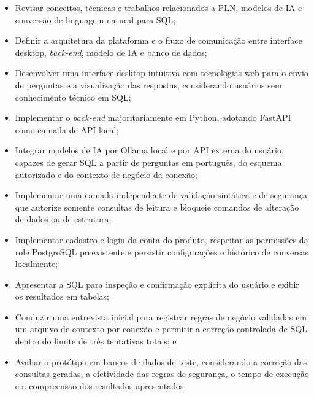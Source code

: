 \begin{itemize}
    \item Revisar conceitos, técnicas e trabalhos relacionados a PLN, modelos de IA e conversão de linguagem natural para SQL;
    \item Definir a arquitetura da plataforma e o fluxo de comunicação entre interface desktop, \textit{back-end}, modelo de IA e banco de dados;
    \item Desenvolver uma interface desktop intuitiva com tecnologias web para o envio de perguntas e a visualização das respostas, considerando usuários sem conhecimento técnico em SQL;
    \item Implementar o \textit{back-end} majoritariamente em Python, adotando FastAPI como camada de API local;
    \item Integrar modelos de IA por Ollama local e por API externa do usuário, capazes de gerar SQL a partir de perguntas em português, do esquema autorizado e do contexto de negócio da conexão;
    \item Implementar uma camada independente de validação sintática e de segurança que autorize somente consultas de leitura e bloqueie comandos de alteração de dados ou de estrutura;
    \item Implementar cadastro e login da conta do produto, respeitar as permissões da role PostgreSQL preexistente e persistir configurações e histórico de conversas localmente;
    \item Apresentar a SQL para inspeção e confirmação explícita do usuário e exibir os resultados em tabelas;
    \item Conduzir uma entrevista inicial para registrar regras de negócio validadas em um arquivo de contexto por conexão e permitir a correção controlada de SQL dentro do limite de três tentativas totais; e
    \item Avaliar o protótipo em bancos de dados de teste, considerando a correção das consultas geradas, a efetividade das regras de segurança, o tempo de execução e a compreensão dos resultados apresentados.
\end{itemize}
